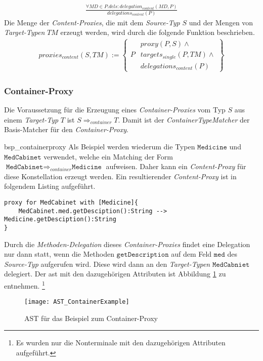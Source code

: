 \begin{gather*}
\frac{\mathit{\forall \mathit{MD} \in P.dels: \mathit{delegation_{content}(MD,P)}}}
{\mathit{delegations_{content}(P)}}
\end{gather*}
\noindent
Die Menge der \emph{Content-Proxies}, die mit dem \emph{Source-Typ} $S$ und der Mengen von \emph{Target-Typen} $\mathit{TM}$ erzeugt werden, wird durch die folgende Funktion beschrieben.
\begin{gather*}
\mathit{proxies_{content}(S,\mathit{TM})} := 
\left\{\begin{array}{l|l}
		& \mathit{proxy(P,S)} \wedge \mathit{ } \\
	P	& \mathit{targets_{single}(P,\mathit{TM})} \wedge \mathit{ }\\
		& \mathit{delegations_{content}(P)} 
		 \end{array}
\right\}
\end{gather*}
\subsubsection{Container-Proxy}
Die Voraussetzung für die Erzeugung eines \emph{Container-Proxies} vom Typ $S$ aus einem \emph{Target-Typ} $T$ ist $S \Rightarrow_{container} T$. Damit ist der \emph{ContainerTypeMatcher} der Basis-Matcher für den \emph{Container-Proxy}.

\begin{example}{bsp_containerproxy}
Als Beispiel werden wiederum die Typen $\texttt{Medicine}$ und $\texttt{MedCabinet}$ verwendet, welche ein Matching der Form $\texttt{MedCabinet} \Rightarrow_{container} \texttt{Medicine}$ aufweisen. Daher kann ein \emph{Content-Proxy} für diese Konstellation erzeugt werden. Ein resultierender \emph{Content-Proxy} ist in folgendem Listing aufgeführt.
\begin{lstlisting}[style = dsl, caption = Container-Proxy für MedCabniet, captionpos = b ]
proxy for MedCabinet with [Medicine]{
	MedCabinet.med.getDesciption():String --> Medicine.getDesciption():String
}
\end{lstlisting}
Durch die \emph{Methoden-Delegation} dieses \emph{Container-Proxies} findet eine Delegation nur dann statt, wenn die Methoden $\texttt{getDescription}$ auf dem Feld $\texttt{med}$ des \emph{Source-Typ} aufgerufen wird. Diese wird dann an den \emph{Target-Typen} $\texttt{MedCabniet}$ delegiert.
\newpage
Der \acrshort{ast} mit den dazugehörigen Attributen ist Abbildung \ref{fig:ASTCONTAINER} zu entnehmen. \footnote{Es wurden nur die Nonterminale mit den dazugehörigen Attributen aufgeführt.}

\end{example}
\begin{figure}[h!]
\centering
\texttt{[image: AST\_ContainerExample]}
\caption{AST für das Beispiel zum Container-Proxy}
\label{fig:ASTCONTAINER}
\end{figure}
\noindent
